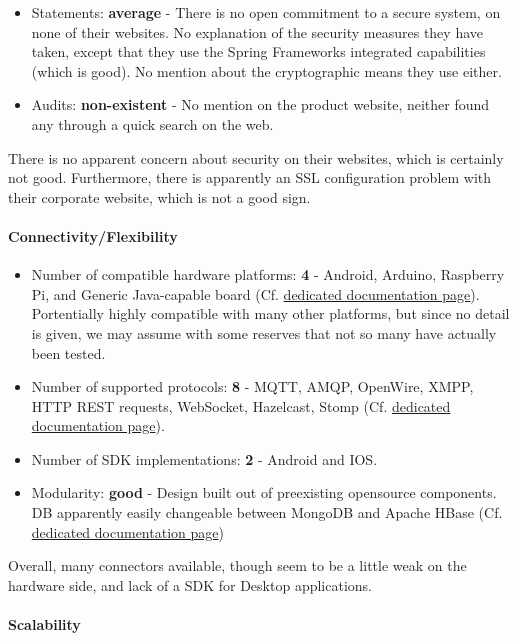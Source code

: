 \documentclass{article}
\begin{document}
\begin{itemize}
\item Statements: \textbf{average} - There is no open commitment to a secure system, on none of their websites. No explanation of the security measures they have taken, except that they use the Spring Frameworks integrated capabilities (which is good). No mention about the cryptographic means they use either.
\item Audits: \textbf{non-existent} - No mention on the product website, neither found any through a quick search on the web.
\end{itemize}

There is no apparent concern about security on their websites, which is certainly not good. Furthermore, there is apparently an SSL configuration problem with their corporate website, which is not a good sign.

\paragraph{Connectivity/Flexibility}

\begin{itemize}
\item Number of compatible hardware platforms: \textbf{4} - Android, Arduino, Raspberry Pi, and Generic Java-capable board (Cf. \href{http://documentation.sitewhere.io/integration.html}{dedicated documentation page}). Portentially highly compatible with many other platforms, but since no detail is given, we may assume with some reserves that not so many have actually been tested.
\item Number of supported protocols: \textbf{8} - MQTT, AMQP, OpenWire, XMPP, HTTP REST requests, WebSocket, Hazelcast, Stomp (Cf. \href{http://documentation.sitewhere.io/userguide/tenant/device-communication.html}{dedicated documentation page}).
\item Number of SDK implementations: \textbf{2} - Android and IOS.
\item Modularity: \textbf{good} - Design built out of preexisting opensource components. DB apparently easily changeable between MongoDB and Apache HBase (Cf. \href{http://documentation.sitewhere.io/architecture.html}{dedicated documentation page})
\end{itemize}

Overall, many connectors available, though seem to be a little weak on the hardware side, and lack of a SDK for Desktop applications.

\paragraph{Scalability}
\end{document}

